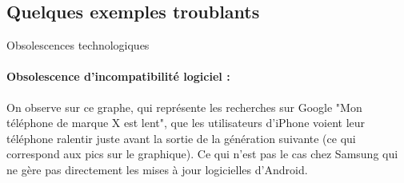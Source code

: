 \subsection{Quelques exemples troublants}


Obsolescences technologiques

\paragraph*{Obsolescence d’incompatibilité logiciel :}

On observe sur ce graphe, qui représente les recherches sur Google "Mon téléphone de marque X est lent", que les utilisateurs d'iPhone voient leur téléphone ralentir juste avant la sortie de la génération suivante (ce qui correspond aux pics sur le graphique). Ce qui n'est pas le cas chez Samsung qui ne gère pas directement les mises à jour logicielles d'Android.

